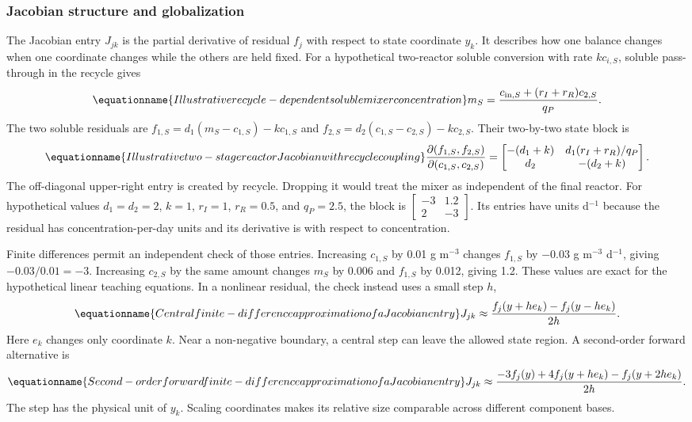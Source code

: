 \subsubsection{Jacobian structure and globalization}

The Jacobian entry $J_{jk}$ is the partial derivative of residual $f_j$ with respect to state coordinate $y_k$. It describes how one balance changes when one coordinate changes while the others are held fixed. For a hypothetical two-reactor soluble conversion with rate $kc_{i,S}$, soluble pass-through in the recycle gives
\begin{equation}
\equationname{Illustrative recycle-dependent soluble mixer concentration}
m_S=\frac{c_{{\rm in},S}+(r_I+r_R)c_{2,S}}{q_P}.
\end{equation}
The two soluble residuals are $f_{1,S}=d_1(m_S-c_{1,S})-kc_{1,S}$ and $f_{2,S}=d_2(c_{1,S}-c_{2,S})-kc_{2,S}$. Their two-by-two state block is
\begin{equation}
\equationname{Illustrative two-stage reactor Jacobian with recycle coupling}
\frac{\partial(f_{1,S},f_{2,S})}{\partial(c_{1,S},c_{2,S})}
=\begin{bmatrix}
-(d_1+k)&d_1(r_I+r_R)/q_P\\
d_2&-(d_2+k)
\end{bmatrix}.
\end{equation}
The off-diagonal upper-right entry is created by recycle. Dropping it would treat the mixer as independent of the final reactor. For hypothetical values $d_1=d_2=2$, $k=1$, $r_I=1$, $r_R=0.5$, and $q_P=2.5$, the block is $\begin{bmatrix}-3&1.2\\2&-3\end{bmatrix}$. Its entries have units d$^{-1}$ because the residual has concentration-per-day units and its derivative is with respect to concentration.

Finite differences permit an independent check of those entries. Increasing $c_{1,S}$ by 0.01 g m$^{-3}$ changes $f_{1,S}$ by $-0.03$ g m$^{-3}$ d$^{-1}$, giving $-0.03/0.01=-3$. Increasing $c_{2,S}$ by the same amount changes $m_S$ by 0.006 and $f_{1,S}$ by 0.012, giving 1.2. These values are exact for the hypothetical linear teaching equations. In a nonlinear residual, the check instead uses a small step $h$,
\begin{equation}
\equationname{Central finite-difference approximation of a Jacobian entry}
J_{jk}\approx\frac{f_j(y+he_k)-f_j(y-he_k)}{2h}.
\end{equation}
Here $e_k$ changes only coordinate $k$. Near a non-negative boundary, a central step can leave the allowed state region. A second-order forward alternative is
\begin{equation}
\equationname{Second-order forward finite-difference approximation of a Jacobian entry}
J_{jk}\approx\frac{-3f_j(y)+4f_j(y+he_k)-f_j(y+2he_k)}{2h}.
\end{equation}
The step has the physical unit of $y_k$. Scaling coordinates makes its relative size comparable across different component bases.

